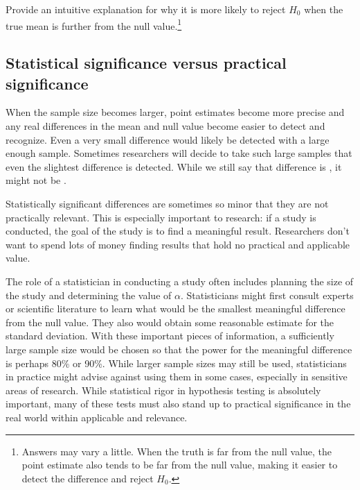 \begin{exercise}
Provide an intuitive explanation for why it is more likely to reject $H_0$ when the true mean is further from the null value.\footnote{Answers may vary a little. When the truth is far from the null value, the point estimate also tends to be far from the null value, making it easier to detect the difference and reject $H_0$.}
\end{exercise}

\subsection{Statistical significance versus practical significance}

When the sample size becomes larger, point estimates become more precise and any real differences in the mean and null value become easier to detect and recognize. Even a very small difference would likely be detected with a large enough sample. Sometimes researchers will decide to take such large samples that even the slightest difference is detected. While we still say that difference is , it might not be .

Statistically significant differences are sometimes so minor that they are not practically relevant. This is especially important to research: if a study is conducted, the goal of the study is to find a meaningful result. Researchers don't want to spend lots of money finding results that hold no practical and applicable value.

The role of a statistician in conducting a study often includes planning the size of the study and determining the value of $\alpha$. Statisticians might first consult experts or scientific literature to learn what would be the smallest meaningful difference from the null value. They also would obtain some reasonable estimate for the standard deviation. With these important pieces of information, a sufficiently large sample size would be chosen so that the power for the meaningful difference is perhaps 80\% or 90\%. While larger sample sizes may still be used, statisticians in practice might advise against using them in some cases, especially in sensitive areas of research. While statistical rigor in hypothesis testing is absolutely important, many of these tests must also stand up to practical significance in the real world within applicable and relevance. 









